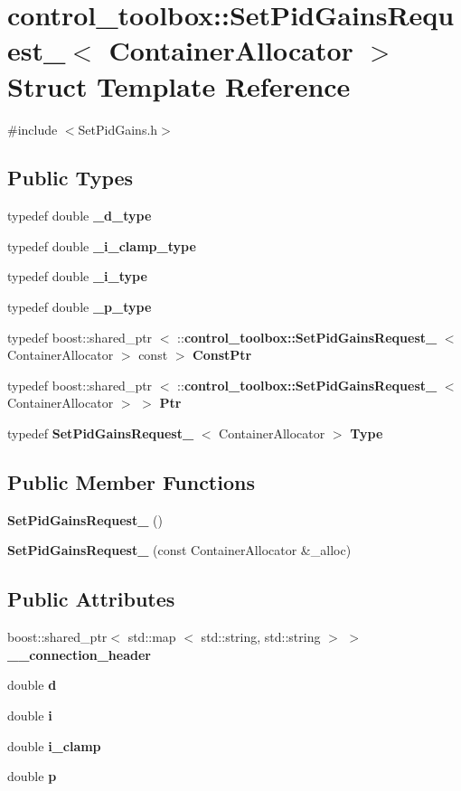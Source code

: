 \section{control\-\_\-toolbox\-:\-:\-Set\-Pid\-Gains\-Request\-\_\-$<$ \-Container\-Allocator $>$ \-Struct \-Template \-Reference}
\label{structcontrol__toolbox_1_1SetPidGainsRequest__}


{\ttfamily \#include $<$\-Set\-Pid\-Gains.\-h$>$}

\subsection*{\-Public \-Types}
\begin{DoxyCompactItemize}
\item 
typedef double {\bf \-\_\-d\-\_\-type}
\item 
typedef double {\bf \-\_\-i\-\_\-clamp\-\_\-type}
\item 
typedef double {\bf \-\_\-i\-\_\-type}
\item 
typedef double {\bf \-\_\-p\-\_\-type}
\item 
typedef boost\-::shared\-\_\-ptr\*
$<$ \-::{\bf control\-\_\-toolbox\-::\-Set\-Pid\-Gains\-Request\-\_\-}\*
$<$ \-Container\-Allocator $>$ const  $>$ {\bf \-Const\-Ptr}
\item 
typedef boost\-::shared\-\_\-ptr\*
$<$ \-::{\bf control\-\_\-toolbox\-::\-Set\-Pid\-Gains\-Request\-\_\-}\*
$<$ \-Container\-Allocator $>$ $>$ {\bf \-Ptr}
\item 
typedef {\bf \-Set\-Pid\-Gains\-Request\-\_\-}\*
$<$ \-Container\-Allocator $>$ {\bf \-Type}
\end{DoxyCompactItemize}
\subsection*{\-Public \-Member \-Functions}
\begin{DoxyCompactItemize}
\item 
{\bf \-Set\-Pid\-Gains\-Request\-\_\-} ()
\item 
{\bf \-Set\-Pid\-Gains\-Request\-\_\-} (const \-Container\-Allocator \&\-\_\-alloc)
\end{DoxyCompactItemize}
\subsection*{\-Public \-Attributes}
\begin{DoxyCompactItemize}
\item 
boost\-::shared\-\_\-ptr$<$ std\-::map\*
$<$ std\-::string, std\-::string $>$ $>$ {\bf \-\_\-\-\_\-connection\-\_\-header}
\item 
double {\bf d}
\item 
double {\bf i}
\item 
double {\bf i\-\_\-clamp}
\item 
double {\bf p}
\end{DoxyCompactItemize}


